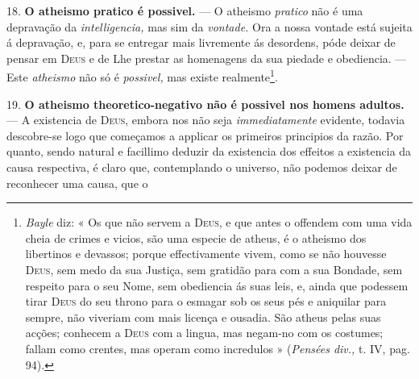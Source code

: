  18. \textbf{O atheismo pratico é possivel.} --- O atheismo \emph{pratico} não é uma depravação da \emph{intelligencia,} mas sim da \emph{vontade.} Ora a nossa vontade está sujeita á depravação, e, para se entregar mais livremente ás desordens, póde deixar de pensar em \textsc{Deus} e de Lhe prestar as homenagens da sua piedade e obediencia. --- Este \emph{atheismo} não só é \emph{possivel,} mas existe realmente\footnote{\emph{Bayle} diz: « Os que não servem a \textsc{Deus}, e que antes o offendem com uma vida cheia de crimes e vicios, são uma especie de atheus, é o atheismo dos libertinos e devassos; porque effectivamente vivem, como se não houvesse \textsc{Deus}, sem medo da sua Justiça, sem gratidão para com a sua Bondade, sem respeito para o seu Nome, sem obediencia ás suas leis, e, ainda que podessem tirar \textsc{Deus} do seu throno para o esmagar sob os seus pés e aniquilar para sempre, não viveriam com mais licença e ousadia. São atheus pelas suas acções; conhecem a \textsc{Deus} com a lingua, mas negam-no com os costumes; fallam como crentes, mas operam como incredulos » (\emph{Pensées div.,} t. IV, pag. 94).}.

19. \textbf{O atheismo theoretico-negativo não é possivel nos homens adultos.} --- A existencia de \textsc{Deus}, embora nos não seja \emph{immediatamente} evidente, todavia descobre-se logo que começamos a applicar os primeiros principios da razão. Por quanto, sendo natural e facillimo deduzir da existencia dos effeitos a existencia da causa respectiva, é claro que, contemplando o universo, não podemos deixar de reconhecer uma causa, que o